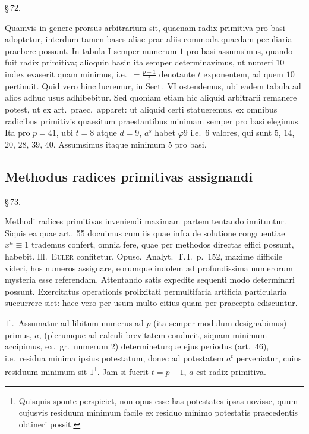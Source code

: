 \documentclass[12pt,a4paper]{article}
\theoremstyle{plain}
\theoremstyle{definition}
\theoremstyle{remark}
\begin{document}
\begin{center}\S\,72.\end{center}

Quamvis in genere prorsus arbitrarium sit, quaenam radix primitiva pro basi adoptetur, interdum tamen bases aliae prae aliis commoda quaedam peculiaria praebere possunt. In tabula I semper numerum $1$ pro basi assumsimus, quando fuit radix primitiva; alioquin basin ita semper determinavimus, ut numeri $10$ index evaserit quam minimus, i.e.\ $= \frac{p-1}{t}$ denotante $t$ exponentem, ad quem $10$ pertinuit. Quid vero hinc lucremur, in Sect.\ VI ostendemus, ubi eadem tabula ad alios adhuc usus adhibebitur. Sed quoniam etiam hic aliquid arbitrarii remanere potest, ut ex art.\ praec.\ apparet: ut aliquid certi statueremus, ex omnibus radicibus primitivis quaesitum praestantibus minimam semper pro basi elegimus. Ita pro $p = 41$, ubi $t = 8$ atque $d = 9$, $a^s$ habet $\varphi 9$ i.e.\ $6$ valores, qui sunt $5$, $14$, $20$, $28$, $39$, $40$. Assumsimus itaque minimum $5$ pro basi.

\subsection*{Methodus radices primitivas assignandi}

\begin{center}\S\,73.\end{center}

Methodi radices primitivas inveniendi maximam partem tentando innituntur. Siquis ea quae art.~55 docuimus cum iis quae infra de solutione congruentiae $x^n \equiv 1$ trademus confert, omnia fere, quae per methodos directas effici possunt, habebit. Ill.\ \textsc{Euler} confitetur, Opusc.\ Analyt.\ T.\,I.\ p.~152, maxime difficile videri, hos numeros assignare, eorumque indolem ad profundissima numerorum mysteria esse referendam. Attentando satis expedite sequenti modo determinari possunt. Exercitatus operationis prolixitati permultifaria artificia particularia succurrere siet: haec vero per usum multo citius quam per praecepta ediscuntur.

$1^\circ$.\ Assumatur ad libitum numerus ad $p$ (ita semper modulum designabimus) primus, $a$, (plerumque ad calculi brevitatem conducit, siquam minimum accipimus, ex.\ gr.\ numerum $2$) determineturque ejus periodus (art.~46), i.e.\ residua minima ipsius potestatum, donec ad potestatem $a^t$ perveniatur, cuius residuum minimum sit $1$\footnote{Quisquis sponte perspiciet, non opus esse has potestates ipsas novisse, quum cujusvis residuum minimum facile ex residuo minimo potestatis praecedentis obtineri possit.}. Jam si fuerit $t = p-1$, $a$ est radix primitiva.
\end{document}
